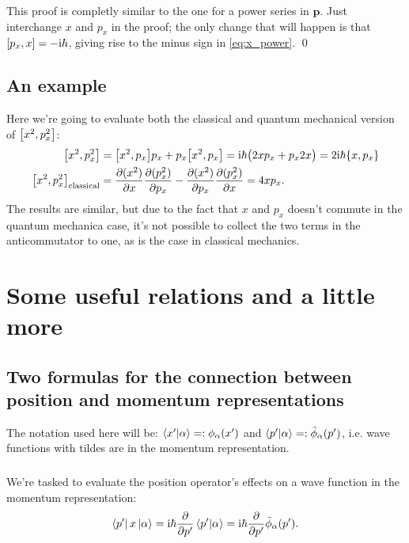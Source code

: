 \documentclass[11pt,letter, swedish, english
]{article}
\begin{document}
This proof is completly similar to the one for a power series in
$\mathbf{p}$. Just interchange $x$ and $p_x$ in the proof; the only
change that will happen is that $\comm{p_x}{x}=-\ii\hbar$, giving rise
to the minus sign in \eqref{eq:x_power}.
\qed

\subsection{An example}
Here we're going to evaluate both the classical and quantum mechanical
version of $\comm{x^2}{p_x^2}$:
\begin{equation}
\begin{aligned}
\comm{x^2}{p_x^2} &= \comm{x^2}{p_x}p_x + p_x\comm{x^2}{p_x} 
= \ii\hbar \big( 2xp_x+p_x2x \big) = 2\ii\hbar\acomm{x}{p_x}\\
\comm{x^2}{p_x^2}_\text{classical} 
&= \pdv{(x^2)}{x}\pdv{(p_x^2)}{p_x} - \pdv{(x^2)}{p_x}\pdv{(p_x^2)}{x}
= 4xp_x.
\end{aligned}
\end{equation}
The results are similar, but due to the fact that $x$ and $p_x$
doesn't commute in the quantum mechanica case, it's not possible to
collect the two terms in the anticommutator to one, as is the case in
classical mechanics.



\section{Some useful relations and a little more}

\subsection{Two formulas for  the connection between position
  and momentum representations}

The notation used here will be: $\braket{x'}{\alpha}=:\phi_\alpha(x')$ and
$\braket{p'}{\alpha}=:\tilde\phi_\alpha(p')$, i.e.  wave functions
with tildes are in the momentum representation.  

\subsubsection{}\label{sec:5ai}
We're tasked to evaluate the position operator's effects on a wave
function in the momentum representation:
\begin{equation}\label{eq:5_pxa}
\bra{p'}x\ket{\alpha} = \mathrm{i}\hbar \pdv{p'} \braket{p'}{\alpha} 
= \mathrm{i}\hbar \pdv{p'} \tilde\phi_\alpha(p').
\end{equation}
\end{document}
